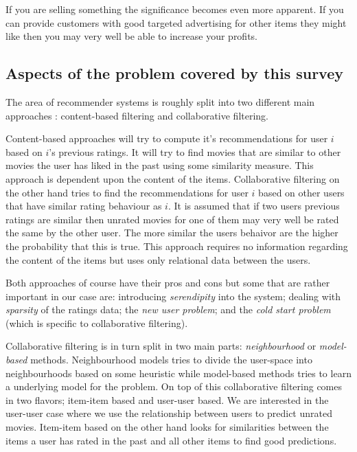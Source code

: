\documentclass[a4paper,11pt]{article}
\begin{document}
If you are selling something the significance becomes even more apparent. If
you can provide customers with good targeted advertising for other items they might like then
you may very well be able to increase your profits.

\subsection{Aspects of the problem covered by this survey}
The area of recommender systems is roughly split into two different main approaches \cite{1423975}:
content-based filtering and collaborative filtering.

Content-based approaches will try to compute it's recommendations for user $i$ based on $i$'s previous ratings.
It will try to find movies that are similar to other movies the user has liked in the past using some
similarity measure. This approach is dependent upon the content of the items. Collaborative filtering
on the other hand tries to find the recommendations for user $i$ based on other users that have similar
rating behaviour as $i$. It is assumed that if two users previous ratings are similar then unrated
movies for one of them may very well be rated the same by the other user. The more similar the users behaivor are
the higher the probability that this is true. This approach requires no information regarding the content
of the items but uses only relational data between the users. 

Both approaches of course have their pros and cons but some that are rather important in our case are:
introducing \emph{serendipity} into the system; dealing with \emph{sparsity} of the ratings data; the
\emph{new user problem}; and the \emph{cold start problem} (which is specific to collaborative filtering).

Collaborative filtering is in turn split in two main parts: \emph{neighbourhood} or \emph{model-based} methods.
Neighbourhood models tries to divide the user-space into neighbourhoods based on some heuristic while model-based
methods tries to learn a underlying model for the problem. 
On top of this collaborative filtering comes in two flavors; item-item based and user-user based. We are interested
in the user-user case where we use the relationship between users to predict unrated movies. Item-item based on the
other hand looks for similarities between the items a user has rated in the past and all other items to find good
predictions. 
\end{document}
